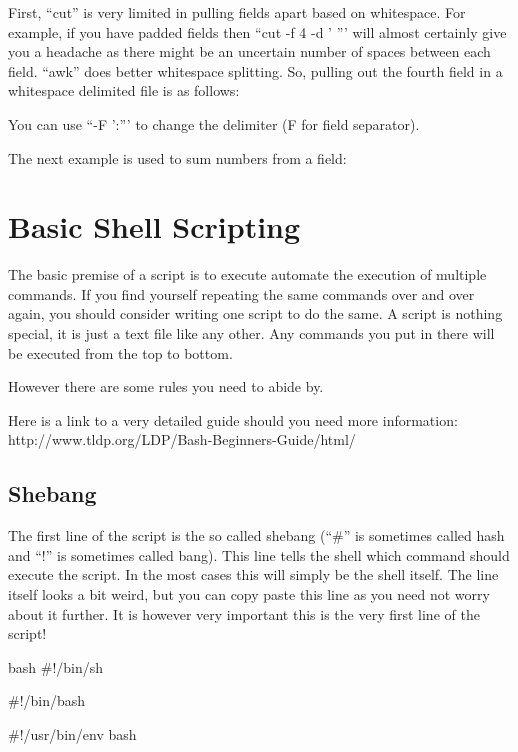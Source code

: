 First, ``cut'' is very limited in pulling fields apart based on whitespace. For
example, if you have padded fields then ``cut -f 4 -d ' ''' will almost
certainly give you a headache as there might be an uncertain number of spaces
between each field. ``awk'' does better whitespace splitting. So, pulling out
the fourth field in a whitespace delimited file is as follows:

\begin{prompt}
\end{prompt}

You can use ``-F ':''' to change the delimiter (F for field separator).

The next example is used to sum numbers from a field:

\begin{prompt}
\end{prompt}

\section{Basic Shell Scripting}

The basic premise of a script is to execute automate the execution of multiple
commands. If you find yourself repeating the same commands over and over again,
you should consider writing one script to do the same.  A script is nothing
special, it is just a text file like any other. Any commands you put in there
will be executed from the top to bottom.

However there are some rules you need to abide by.

Here is a link to a very detailed guide should you need more information:
http://www.tldp.org/LDP/Bash-Beginners-Guide/html/

\subsection{Shebang}
The first line of the script is the so called shebang (``#'' is sometimes called
hash and ``!'' is sometimes called bang). This line tells the shell which
command should execute the script. In the most cases this will simply be the
shell itself. The line itself looks a bit weird, but you can copy paste this
line as you need not worry about it further. It is however very important this
is the very first line of the script!

\begin{code}{bash}
 #!/bin/sh

 #!/bin/bash

 #!/usr/bin/env bash
\end{code}

